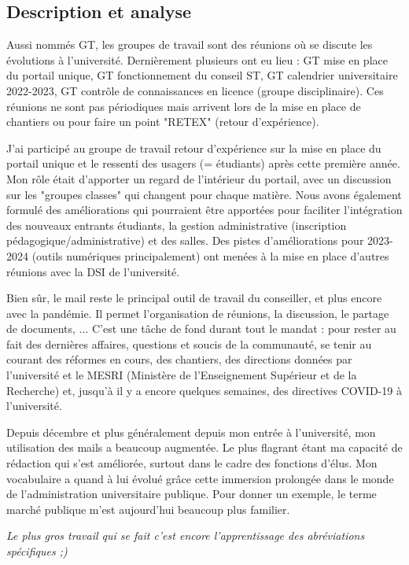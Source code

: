 \documentclass{article}
\begin{document}
\subsection{Description et analyse}
Aussi nommés GT, les groupes de travail sont des réunions où se discute les évolutions à l'université. Dernièrement plusieurs ont eu lieu : GT mise en place du portail unique, GT fonctionnement du conseil ST, GT calendrier  universitaire 2022-2023, GT contrôle de connaissances en licence (groupe disciplinaire). Ces réunions ne sont pas périodiques mais arrivent lors de la mise en place de chantiers ou pour faire un point "RETEX" (retour d'expérience).

J'ai participé au groupe de travail retour d'expérience sur la mise en place du portail unique et le ressenti des usagers (= étudiants) après cette première année. Mon rôle était d'apporter un regard de l'intérieur du portail, avec un discussion sur les "groupes classes" qui changent pour chaque matière. Nous avons également formulé des améliorations qui pourraient être apportées pour faciliter l'intégration des nouveaux entrants étudiants, la gestion administrative (inscription pédagogique/administrative) et des salles. Des pistes d'améliorations pour 2023-2024 (outils numériques principalement) ont menées à la mise en place d'autres réunions avec la DSI de l'université.

Bien sûr, le mail reste le principal outil de travail du conseiller, et plus encore avec la pandémie. Il permet l'organisation de réunions, la discussion, le partage de documents, ... C'est une tâche de fond durant tout le mandat : pour rester au fait des dernières affaires, questions et soucis de la communauté, se tenir au courant des réformes en cours, des chantiers, des directions données par l'université et le MESRI (Ministère de l'Enseignement Supérieur et de la Recherche) et, jusqu'à il y a encore quelques semaines, des directives COVID-19 à l'université.

Depuis décembre et plus généralement depuis mon entrée à l'université, mon utilisation des mails a beaucoup augmentée. Le plus flagrant étant ma capacité de rédaction qui s'est améliorée, surtout dans le cadre des fonctions d'élus. Mon vocabulaire a quand à lui évolué grâce cette immersion prolongée dans le monde de l'administration universitaire publique. Pour donner un exemple, le terme marché publique m'est aujourd'hui beaucoup plus familier. 

\textit{Le plus gros travail qui se fait c'est encore l'apprentissage des abréviations spécifiques ;)}
\end{document}
